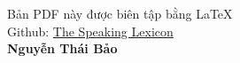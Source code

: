\begin{flushright}
Bản PDF này được biên tập bằng \LaTeX\\
\vspace{0.25cm}
Github: \href{https://github.com/therad0m/The-Speaking-Lexicon}{The Speaking Lexicon}\\
\vspace{0.25cm}
\textbf{Nguyễn Thái Bảo}\\
\end{flushright}

\newpage

\clearpage
{
  \makeatletter
  \let\ps@plain\ps@empty
  \makeatother
  \pagestyle{empty}
  \tableofcontents
}
\clearpage